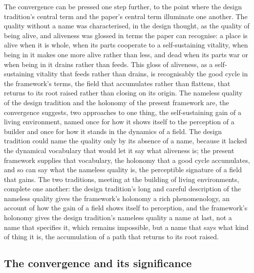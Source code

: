 The convergence can be pressed one step further, to the point where the design tradition's central term and the paper's central term illuminate one another. The quality without a name was characterised, in the design thought, as the quality of being alive, and aliveness was glossed in terms the paper can recognise: a place is alive when it is whole, when its parts cooperate to a self-sustaining vitality, when being in it makes one more alive rather than less, and dead when its parts war or when being in it drains rather than feeds. This gloss of aliveness, as a self-sustaining vitality that feeds rather than drains, is recognisably the good cycle in the framework's terms, the field that accumulates rather than flattens, that returns to its root raised rather than closing on its origin. The nameless quality of the design tradition and the holonomy of the present framework are, the convergence suggests, two approaches to one thing, the self-sustaining gain of a living environment, named once for how it shows itself to the perception of a builder and once for how it stands in the dynamics of a field. The design tradition could name the quality only by its absence of a name, because it lacked the dynamical vocabulary that would let it say what aliveness is; the present framework supplies that vocabulary, the holonomy that a good cycle accumulates, and so can say what the nameless quality is, the perceptible signature of a field that gains. The two traditions, meeting at the building of living environments, complete one another: the design tradition's long and careful description of the nameless quality gives the framework's holonomy a rich phenomenology, an account of how the gain of a field shows itself to perception, and the framework's holonomy gives the design tradition's nameless quality a name at last, not a name that specifies it, which remains impossible, but a name that says what kind of thing it is, the accumulation of a path that returns to its root raised.

\subsection{The convergence and its significance}
\label{p22:sub:alex-convergence}

